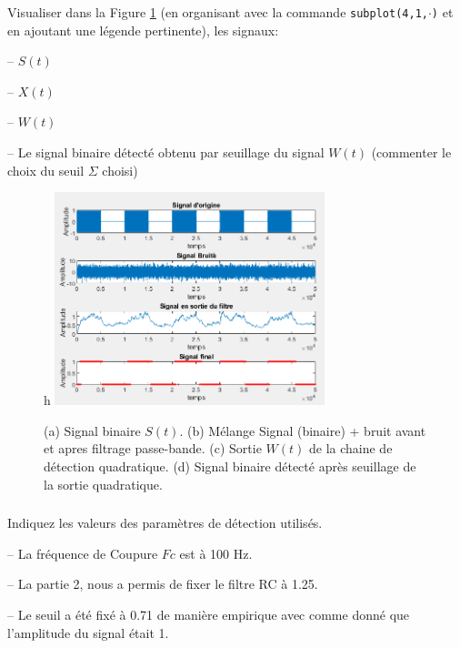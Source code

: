 \documentclass{article}
\begin{document}
Visualiser dans la Figure \ref{fig-binaire}  (en organisant avec la commande {\tt subplot(4,1,$\cdot$)} et en ajoutant une légende pertinente), les signaux:\\[-3mm]
\begin{list}{-}{\setlength{\leftmargin}{3mm} \setlength{\labelwidth}{20mm} \setlength{\labelsep}{2mm} \setlength{\itemsep}{1mm} }
\item[--] $S(t)$
\item[--] $X(t)$
\item[--] $W(t)$
\item[--] Le signal binaire détecté obtenu par seuillage du signal $W(t)$ (commenter le choix du seuil $\Sigma$ choisi)
\end{list} 
\newpage
\begin{figure}{h}
    \centering
    \includegraphics[width=0.7\textwidth]{images/partie3.png}
\caption{(a) Signal binaire $S(t)$. (b) Mélange Signal (binaire) + bruit avant et apres filtrage passe-bande. (c) Sortie $W(t)$ de la chaine de détection quadratique. (d) Signal binaire détecté après seuillage de la sortie quadratique.}
\label{fig-binaire}
\end{figure}

\subsubsection{}

Indiquez les valeurs des paramètres de détection utilisés.
\begin{list}{-}{\setlength{\leftmargin}{9mm} \setlength{\labelwidth}{20mm} \setlength{\labelsep}{2mm} \setlength{\itemsep}{1mm} }
\item[--] La fréquence de Coupure $Fc$ est à 100 Hz.
\item[--] La partie 2, nous a permis de fixer le filtre RC à 1.25.
\item[--] Le seuil a été fixé à 0.71 de manière empirique avec comme donné que l'amplitude du signal était 1. 
\end{list} 
\end{document}
